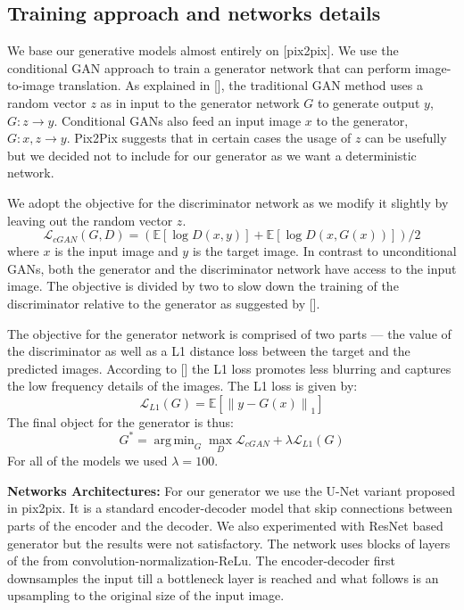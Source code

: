 \documentclass{llncs}
\DeclareMathOperator*{\argminA}{arg\,min}
\begin{document}
\subsection{Training approach and networks details}
We base our generative models almost entirely on [pix2pix]. We use the conditional GAN approach to train a generator network that can perform image-to-image translation. As explained in [], the traditional GAN method uses a random vector $z$ as in input to the generator network $G$ to generate output $y$, $G:z \rightarrow y$. Conditional GANs also feed an input image $x$ to the generator, $G: x,z \rightarrow y$. Pix2Pix suggests that in certain cases the usage of $z$ can be usefully but we decided not to include for our generator as we want a deterministic network.

We adopt the objective for the discriminator network as we modify it slightly by leaving out the random vector $z$.
\begin{equation}
\mathcal{L}_{cGAN} (G, D) = (\mathbb{E}[\log D (x,y)] + \mathbb{E}[\log D (x, G(x))])/2
\end{equation}
where $x$ is the input image and $y$ is the target image. In contrast to unconditional GANs, both the generator and the discriminator network have access to the input image. The objective is divided by two to slow down the training of the discriminator relative to the generator as suggested by [].

The objective for the generator network is comprised of two parts --- the value of the discriminator as well as a L1 distance loss between the target and the predicted images. According to [] the L1 loss promotes less blurring and captures the low frequency details of the images. The L1 loss is given by:
\begin{equation}
\mathcal{L}_{L1} (G) = \mathbb{E}[\left\lVert y - G(x)\right\rVert_1]
\end{equation}
The final object for the generator is thus:
\begin{equation}
G^* = \argminA_G \max_D \mathcal{L}_{cGAN}  + \lambda \mathcal{L}_{L1} (G)
\end{equation}
For all of the models we used $\lambda = 100$.

\noindent\textbf{Networks Architectures:} For our generator we use the U-Net variant proposed in pix2pix. It is a standard encoder-decoder model that skip connections between parts of the encoder and the decoder. We also experimented with ResNet based generator but the results were not satisfactory. The network uses blocks of layers of the from convolution-normalization-ReLu. The encoder-decoder first downsamples the input till a bottleneck layer is reached and what follows is an upsampling to the original size of the input image.
\end{document}
